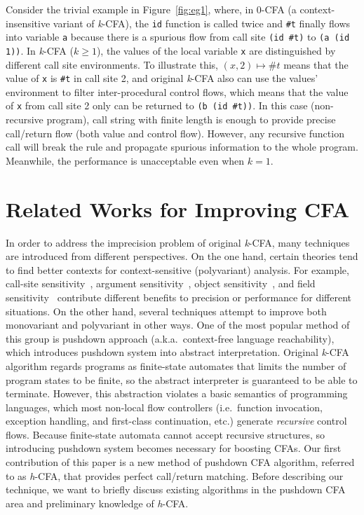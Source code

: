 \documentclass{article}
\begin{document}
Consider the trivial example in Figure~\ref{fig:eg1}, where, in 0-CFA (a context-insensitive variant of \textit{k}-CFA), the \verb|id| function is called twice and \verb|#t| finally flows into variable \verb|a| because there is a spurious flow from call site \verb|(id #t)| to \verb|(a (id 1))|.
In \textit{k}-CFA ($k \geq 1$), the values of the local variable \verb|x| are distinguished by different call site environments.
To illustrate this, $(x, 2) \mapsto \#t$ means that the value of \verb|x| is \verb|#t| in call site 2, and original \textit{k}-CFA also can use the values' environment to filter inter-procedural control flows, which means that the value of \verb|x| from call site 2 only can be returned to \verb|(b (id #t))|.
In this case (non-recursive program), call string with finite length is enough to provide precise call/return flow (both value and control flow).
However, any recursive function call will break the rule and propagate spurious information to the whole program.
Meanwhile, the performance is unacceptable even when $k = 1$.


\section{Related Works for Improving CFA}
\label{sec:Related Works for Improving CFA}
In order to address the imprecision problem of original \textit{k}-CFA, many techniques are introduced from different perspectives.
On the one hand, certain theories tend to find better contexts for context-sensitive (polyvariant) analysis.
For example, call-site sensitivity~\cite{shivers1991control}, argument sensitivity~\cite{agesen1995cartesian}, object sensitivity~\cite{milanova2005parameterized, smaragdakis2011pick}, and field sensitivity~\cite{lhotak2003scaling} contribute different benefits to precision or performance for different situations.
On the other hand, several techniques attempt to improve both monovariant and polyvariant in other ways.
One of the most popular method of this group is pushdown approach (a.k.a.\ context-free language reachability), which introduces pushdown system into abstract interpretation. %
Original \textit{k}-CFA algorithm regards programs as finite-state automates that limits the number of program states to be finite, so the abstract interpreter is guaranteed to be able to terminate.
However, this abstraction violates a basic semantics of programming languages, which most non-local flow controllers (i.e.\ function invocation, exception handling, and first-class continuation, etc.) generate \emph{recursive} control flows.
Because finite-state automata cannot accept recursive structures, so introducing pushdown system becomes necessary for boosting CFAs.
Our first contribution of this paper is a new method of pushdown CFA algorithm, referred to as \textit{h}-CFA, that provides perfect call/return matching.
Before describing our technique, we want to briefly discuss existing algorithms in the pushdown CFA area and preliminary knowledge of \textit{h}-CFA\@.
\end{document}
